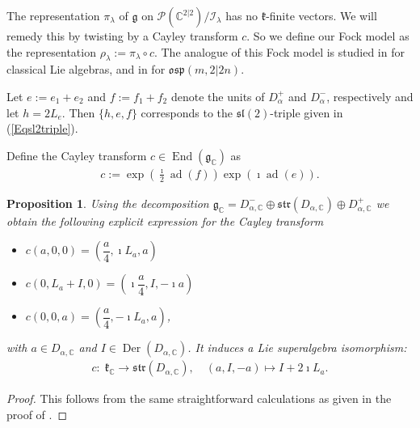 \documentclass{amsart}
\newtheorem{Prop}[theorem]{Proposition}
\numberwithin{theorem}{section}
\theoremstyle{definition}
\theoremstyle{remark}
\def\C{\mathds{C} }
\DeclareMathOperator{\ad}{ad}
\DeclareMathOperator{\End}{End}
\newcommand{\mf}[1]{\mathfrak{#1}}
\newcommand{\mc}[1]{\mathcal{#1}}
\newcommand{\mg}{{\mathfrak{g}}}
\DeclareMathOperator{\Der}{Der}
\begin{document}
The representation $\pi_\lambda$ of $\mg$ on $\mc{P} (\mathds{C}^{2 |2}) / \mc{I}_\lambda$ has no $\mf{k}$-finite vectors. We will remedy this by twisting by a Cayley transform $c$. 
So we define our Fock model as the representation $\rho_\lambda := \pi_{\lambda} \circ c$. The analogue of this Fock model is studied in \cite{HKMO} for classical Lie algebras, and in \cite{BCD} for $\mf{osp}(m,2|2n)$.

Let $e := e_1+e_2$ and $f := f_1+f_2$ denote the units of $D_\alpha^+$ and $D_\alpha^-$, respectively and let $h = 2L_e$. Then $\{h, e, f\}$ corresponds to the $\mf{sl}(2)$-triple given in (\ref{Eqsl2triple}). 

Define the Cayley transform $c \in \End(\mf{g}_\C)$ as
\begin{align*}
c := \exp(\frac{\imath}{2}\ad(f))\exp(\imath\ad(e)).
\end{align*}

\begin{Prop} Using the decomposition $\mf{g}_\C= D^-_{\alpha,\C}\oplus \mathfrak{str}(D_{\alpha,\C})\oplus D^+_{\alpha,\C} $ we obtain the following explicit expression for the Cayley transform
\begin{itemize}
\item $c(a,0,0) = \left(\dfrac{a}{4}, \imath L_a, a\right)$
\item $c(0,L_a+I,0) = \left(\imath \dfrac{a}{4}, I, -\imath a\right)$
\item $c(0,0,a) = \left(\dfrac{a}{4}, -\imath L_a, a\right)$,
\end{itemize}
with $a\in D_{\alpha,\C}$ and $I\in \Der(D_{\alpha,\C})$. It induces a Lie superalgebra isomorphism:
\begin{align*}
c:\;\mathfrak{k}_\C \rightarrow \mathfrak{str}(D_{\alpha,\C}),\quad (a,I,-a) \mapsto I + 2\imath L_a.
\end{align*}
\end{Prop}

\begin{proof}
This follows from the same straightforward calculations as given in the proof of \cite[Proposition 5.1]{BCD}.
\end{proof}
\end{document}
